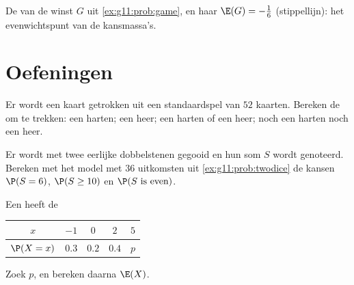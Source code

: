 \begin{omfigure}

{\small De  van de winst $G$ uit \cref{ex:g11:prob:game}, en
haar  $\E(G) = -\frac16$ (stippellijn): het evenwichtspunt
van de kansmassa's.}
\end{omfigure}

\section{Oefeningen}

\begin{exercise}[$\star$]\label{exo:g11:prob:1}
Er wordt een kaart getrokken uit een standaardspel van $52$ kaarten. Bereken
de  om te trekken: een harten; een heer; een harten of een heer; noch
een harten noch een heer.
\end{exercise}

\begin{exercise}[$\star$]\label{exo:g11:prob:2}
Er wordt met twee eerlijke dobbelstenen gegooid en hun som $S$ wordt
genoteerd. Bereken met het model met $36$ uitkomsten uit
\cref{ex:g11:prob:twodice} de kansen $\P(S = 6)$, $\P(S \geq 10)$ en
$\P(S \text{ is even})$.
\end{exercise}

\begin{exercise}[$\star$]\label{exo:g11:prob:3}
Een  heeft de 
\begin{center}
\begin{tabular}{c|cccc}
$x$ & $-1$ & $0$ & $2$ & $5$\\
\hline
$\P(X=x)$ & $0.3$ & $0.2$ & $0.4$ & $p$
\end{tabular}
\end{center}
Zoek $p$, en bereken daarna $\E(X)$.
\end{exercise}

